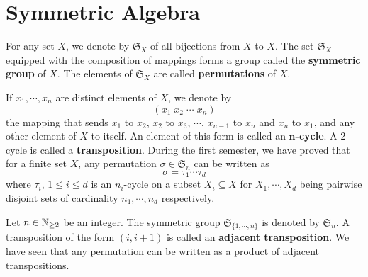 \section{Symmetric Algebra}

\begin{definitionenv}
    For any set $X$, we denote by $\mathfrak{S}_X$ of all bijections from $X$ to $X$.
    The set $\mathfrak{S}_X$ equipped with the composition of mappings forms a group called the \textbf{symmetric group} of $X$.
    The elements of $\mathfrak{S}_X$ are called \textbf{permutations} of $X$.

    \quad If $x_1,\cdots,x_n$ are distinct elements of $X$, we denote by
    $$ (x_1\; x_2\; \cdots\; x_n)$$
    the mapping that sends $x_1$ to $x_2$, $x_2$ to $x_3$, $\cdots$, $x_{n-1}$ to $x_n$ and $x_n$ to $x_1$, and any other element of $X$ to itself.
    An element of this form is called an \textbf{$\bm{n}$-cycle}.
    A $2$-cycle is called a \textbf{transposition}.
    During the first semester, we have proved that for a finite set $X$, any permutation $\sigma \in \mathfrak{S}_n$ can be written as
    $$ \sigma = \tau_1 \cdots \tau_d$$
    where $\tau_i$, $1\le i\le d$ is an $n_i$-cycle on a subset $X_i \subseteq X$ for $X_1,\cdots,X_d$ being pairwise disjoint sets of cardinality $n_1,\cdots,n_d$ respectively.
\end{definitionenv}

\begin{remark}
    Let $n\in \mathbb{N}_{\ge 2}$ be an integer.
    The symmetric group $\mathfrak{S}_{\{1,\cdots,n\}}$ is denoted by $\mathfrak{S}_{n}$.
    A transposition of the form $(i,i+1)$ is called an \textbf{adjacent transposition}.
    We have seen that any permutation can be written as a product of adjacent transpositions.
\end{remark}


